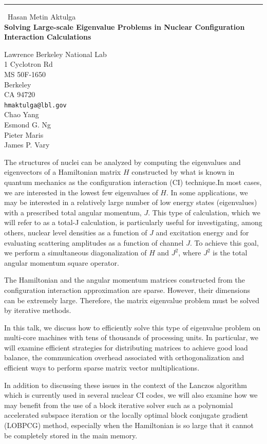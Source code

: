 \documentclass{report}
\begin{document}
\begin{center}
\rule{6in}{1pt} \
{\large Hasan Metin Aktulga \\
{\bf Solving Large-scale Eigenvalue Problems in Nuclear Configuration Interaction Calculations}}

Lawrence Berkeley National Lab \\ 1 Cyclotron Rd \\ MS 50F-1650 \\ Berkeley \\ CA 94720
\\
{\tt hmaktulga@lbl.gov}\\
Chao Yang\\
Esmond G. Ng\\
Pieter Maris\\
James P. Vary\end{center}

The structures of nuclei can be analyzed by computing the eigenvalues and
eigenvectors of a Hamiltonian matrix $H$ constructed by what is known in
quantum mechanics as the configuration interaction (CI) technique.In most
cases, we are interested in the lowest few eigenvalues of $H$. In some
applications, we may be interested in a relatively large number of low
energy states (eigenvalues) with a prescribed total angular momentum,
$J$. This type of calculation, which we will refer to as a total-J
calculation, is particularly useful for investigating, among others,
nuclear level densities as a function of $J$ and excitation energy and
for evaluating scattering amplitudes as a function of channel $J$. To
achieve this goal, we perform a simultaneous diagonalization of $H$ and
$J^2$, where $J^2$ is the total angular momentum square operator.

The Hamiltonian and the angular momentum matrices constructed from the
configuration interaction approximation are sparse. However, their
dimensions can be extremely large. Therefore, the matrix eigenvalue
problem must be solved by iterative methods.

In this talk, we discuss how to efficiently solve this type of
eigenvalue problem on multi-core machines with tens of thousands
of processing units. In particular, we will examine efficient
strategies for distributing matrices to achieve good load balance,
the communication overhead associated with orthogonalization and
efficient ways to perform sparse matrix vector multiplications.

In addition to discussing these issues in the context of the Lanczos
algorithm which is currently used in several nuclear CI codes, we will
also examine how we may benefit from the use of a block iterative solver
such as a polynomial accelerated subspace
iteration or the locally optimal block conjugate gradient (LOBPCG)
method, especially when the Hamiltonian is so large that it cannot
be completely stored in the main memory.
\end{document}
